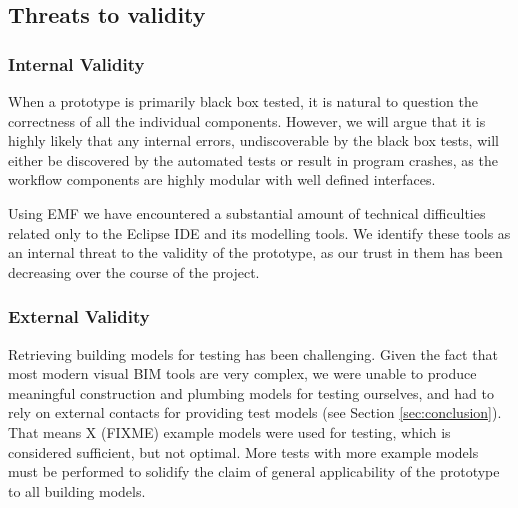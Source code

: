 \subsection{Threats to validity}
\subsubsection{Internal Validity} When a prototype is primarily black box tested, it is natural to question the correctness of all the individual components. However, we will argue that it is highly likely that any internal errors, undiscoverable by the black box tests, will either be discovered by the automated tests or result in program crashes, as the workflow components are highly modular with well defined interfaces.

Using EMF we have encountered a substantial amount of technical difficulties related only to the Eclipse IDE and its modelling tools. We identify these tools as an internal threat to the validity of the prototype, as our trust in them has been decreasing over the course of the project.

\subsubsection{External Validity} Retrieving building models for testing has been challenging. Given the fact that most modern visual BIM tools are very complex, we were unable to produce meaningful construction and plumbing models for testing ourselves, and had to rely on external contacts for providing test models (see Section \ref{sec:conclusion}). That means X (FIXME) example models were used for testing, which is considered sufficient, but not optimal. More tests with more example models must be performed to solidify the claim of general applicability of the prototype to all building models.







